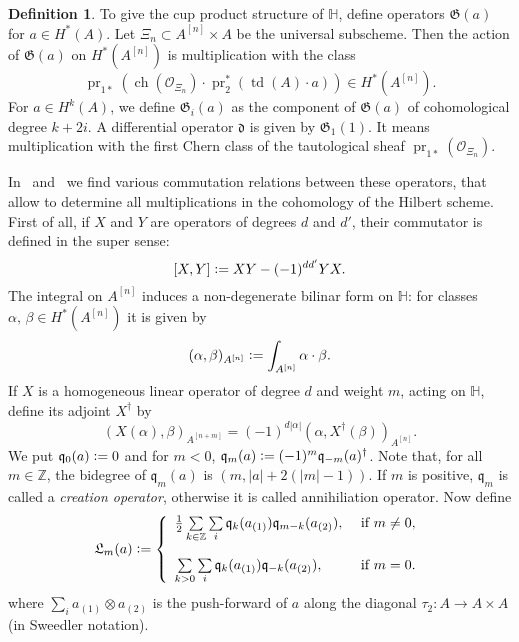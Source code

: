 \documentclass{alggeom}
\DeclareMathOperator{\ch}{ch}
\DeclareMathOperator{\td}{td}
\DeclareMathOperator{\pr}{pr}
\newcommand{\hilb}[1]{^{[#1]}}
\newcommand{\G}{\mathfrak{G}}
\newcommand{\q}{\mathfrak{q}}
\newcommand{\defIs}{\vcentcolon=}
\renewcommand{\H}{\mathbb{H}}
\newcommand{\Q}{\mathbb{Q}}
\newcommand{\Z}{\mathbb{Z}}
\theoremstyle{plain}
\theoremstyle{definition}
\newtheorem{definition}[theorem]{Definition}
\theoremstyle{remark}
\newtheorem{remark}[theorem]{Remark}
\begin{document}
\begin{definition}
To give the cup product structure of $\H$, define operators $\G(a)$ for $a \in H^*(A)$. Let $\Xi_n \subset A\hilb{n}\times A$ be the universal subscheme. Then the action of $\G(a)$ on $H^*(A\hilb{n})$ is multiplication with the class
$$
\pr_{1*}\left( \ch(\mathcal{O}_{\Xi_n})\cdot \pr_2^*(\td(A)\cdot a) \right) \in H^*(A\hilb{n}).
$$
For $a \in H^k(A)$, we define $\G_i(a)$ as the component of $\G(a)$ of cohomological degree $k+2i$. A differential operator $\mathfrak{d}$ is given by $\G_1(1)$. It means multiplication with the first Chern class of the tautological sheaf $\pr_{1*}\left( \mathcal{O}_{\Xi_n}\right)$.
\end{definition}
In~\cite{LehnSorger} and~\cite{LiQinWang} we find various commutation relations between these operators, that allow to determine all multiplications in the cohomology of the Hilbert scheme. First of all, if $X$ and $Y$ are operators of degrees $d$ and $d'$, their commutator is defined in the super sense: 
$$
[X,Y] \defIs  XY - (-1)^{dd'}YX.
$$
The integral on $A\hilb{n}$ induces a non-degenerate bilinar form on $\H$: for classes $\alpha,\,\beta\in H^*(A\hilb{n})$ it is given by
$$
(\alpha,\beta)_{A\hilb{n}} \defIs   \int_{A\hilb{n}}\alpha\cdot\beta.
$$
If $X$ is a homogeneous linear operator of degree $d$ and weight $m$, acting on $\H$, define its adjoint $X^\dagger$ by
$$
(X(\alpha),\beta)_{A\hilb{n+m}}  = (-1)^{d|\alpha|}( \alpha , X^\dagger (\beta))_{A\hilb{n}}.
$$
We put $\q_0(a) \defIs 0$ and for $m<0$, $\q_m(a) \defIs  (-1)^m \q_{-m}(a)^\dagger$. Note that, for all $m\in\Z$, the bidegree of $\q_m(a)$ is $(m,|a| + 2(|m|-1))$. If $m$ is positive, $\q_m$ is called a \emph{creation operator}, otherwise it is called annihiliation operator. Now define
$$
\mathfrak{L}_m(a) \defIs  \left\{ 
\begin{array}{ll}
 \tfrac{1}{2}\sum\limits_{k\in\Z}\sum\limits_{i}\q_k( a_{(1)})\q_{m-k}( a_{(2)}), & \text{ if } m\neq 0, \vspace{4mm}\\
 \sum\limits_{k>0}\sum\limits_{i}\q_k( a_{(1)})\q_{-k}( a_{(2)}), & \text{ if } m= 0. \\
\end{array}
\right.
$$
where $\sum_i a_{(1)}\otimes  a_{(2)}$ is the push-forward of $a$ along the diagonal $\tau_2 :A \rightarrow A\times A$ (in Sweedler notation).
\end{document}
